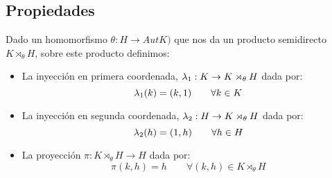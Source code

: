 \subsection{Propiedades}
\begin{definicion}
    Dado un homomorfismo $\theta:H\to AutK)$ que nos da un producto semidirecto $K\rtimes_\theta H$, sobre este producto definimos:
    \begin{itemize}
        \item La inyección en primera coordenada, $\lambda_1:K\to K\rtimes_\theta H$ dada por:
            \begin{equation*}
                \lambda_1(k) = (k,1) \qquad \forall k\in K
            \end{equation*}
        \item La inyección en segunda coordenada, $\lambda_2:H\to K\rtimes_\theta H$ dada por:
            \begin{equation*}
                \lambda_2(h) = (1,h) \qquad \forall h\in H
            \end{equation*}
        \item La proyección $\pi:K\rtimes_\theta H \to H$ dada por:
            \begin{equation*}
                \pi(k,h) = h \qquad \forall (k,h)\in K\rtimes_\theta H
            \end{equation*}
    \end{itemize}
    \begin{figure}[H]
        \centering
    \end{figure}
\end{definicion}

